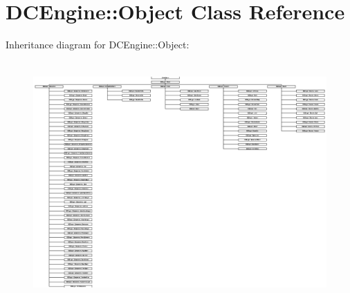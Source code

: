 \hypertarget{classDCEngine_1_1Object}{\section{D\-C\-Engine\-:\-:Object Class Reference}
\label{classDCEngine_1_1Object}
}
Inheritance diagram for D\-C\-Engine\-:\-:Object\-:\begin{figure}[H]
\begin{center}
\leavevmode
\includegraphics[height=9.237114cm]{classDCEngine_1_1Object}
\end{center}
\end{figure}
